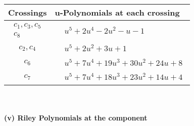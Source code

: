 \documentclass[1p]{elsarticle_modified}
\theoremstyle{definition}
\begin{document}
\begin{tabular}{m{50pt}|m{274pt}}
Crossings & \hspace{64pt}u-Polynomials at each crossing \\
\hline $$\begin{aligned}c_{1},c_{3},c_{5}\\c_{8}\end{aligned}$$&$\begin{aligned}
&u^5+2 u^4-2 u^2- u-1
\end{aligned}$\\
\hline $$\begin{aligned}c_{2},c_{4}\end{aligned}$$&$\begin{aligned}
&u^5+2 u^2+3 u+1
\end{aligned}$\\
\hline $$\begin{aligned}c_{6}\end{aligned}$$&$\begin{aligned}
&u^5+7 u^4+19 u^3+30 u^2+24 u+8
\end{aligned}$\\
\hline $$\begin{aligned}c_{7}\end{aligned}$$&$\begin{aligned}
&u^5+7 u^4+18 u^3+23 u^2+14 u+4
\end{aligned}$\\
\hline
\end{tabular}\\~\\
\newpage\renewcommand{\arraystretch}{1}
\flushleft \textbf{(v) Riley Polynomials at the component}\newline \\
\end{document}
